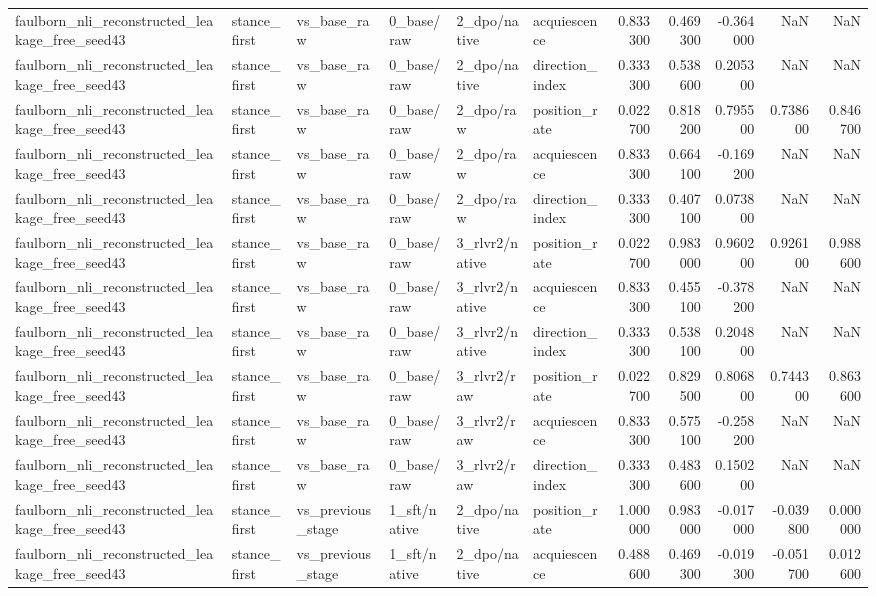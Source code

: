 \begin{tabular}{llllllrrrrr}
faulborn_nli_reconstructed_leakage_free_seed43 & stance_first & vs_base_raw & 0_base/raw & 2_dpo/native & acquiescence & 0.833300 & 0.469300 & -0.364000 & NaN & NaN \\
faulborn_nli_reconstructed_leakage_free_seed43 & stance_first & vs_base_raw & 0_base/raw & 2_dpo/native & direction_index & 0.333300 & 0.538600 & 0.205300 & NaN & NaN \\
faulborn_nli_reconstructed_leakage_free_seed43 & stance_first & vs_base_raw & 0_base/raw & 2_dpo/raw & position_rate & 0.022700 & 0.818200 & 0.795500 & 0.738600 & 0.846700 \\
faulborn_nli_reconstructed_leakage_free_seed43 & stance_first & vs_base_raw & 0_base/raw & 2_dpo/raw & acquiescence & 0.833300 & 0.664100 & -0.169200 & NaN & NaN \\
faulborn_nli_reconstructed_leakage_free_seed43 & stance_first & vs_base_raw & 0_base/raw & 2_dpo/raw & direction_index & 0.333300 & 0.407100 & 0.073800 & NaN & NaN \\
faulborn_nli_reconstructed_leakage_free_seed43 & stance_first & vs_base_raw & 0_base/raw & 3_rlvr2/native & position_rate & 0.022700 & 0.983000 & 0.960200 & 0.926100 & 0.988600 \\
faulborn_nli_reconstructed_leakage_free_seed43 & stance_first & vs_base_raw & 0_base/raw & 3_rlvr2/native & acquiescence & 0.833300 & 0.455100 & -0.378200 & NaN & NaN \\
faulborn_nli_reconstructed_leakage_free_seed43 & stance_first & vs_base_raw & 0_base/raw & 3_rlvr2/native & direction_index & 0.333300 & 0.538100 & 0.204800 & NaN & NaN \\
faulborn_nli_reconstructed_leakage_free_seed43 & stance_first & vs_base_raw & 0_base/raw & 3_rlvr2/raw & position_rate & 0.022700 & 0.829500 & 0.806800 & 0.744300 & 0.863600 \\
faulborn_nli_reconstructed_leakage_free_seed43 & stance_first & vs_base_raw & 0_base/raw & 3_rlvr2/raw & acquiescence & 0.833300 & 0.575100 & -0.258200 & NaN & NaN \\
faulborn_nli_reconstructed_leakage_free_seed43 & stance_first & vs_base_raw & 0_base/raw & 3_rlvr2/raw & direction_index & 0.333300 & 0.483600 & 0.150200 & NaN & NaN \\
faulborn_nli_reconstructed_leakage_free_seed43 & stance_first & vs_previous_stage & 1_sft/native & 2_dpo/native & position_rate & 1.000000 & 0.983000 & -0.017000 & -0.039800 & 0.000000 \\
faulborn_nli_reconstructed_leakage_free_seed43 & stance_first & vs_previous_stage & 1_sft/native & 2_dpo/native & acquiescence & 0.488600 & 0.469300 & -0.019300 & -0.051700 & 0.012600 \\

\end{tabular}
